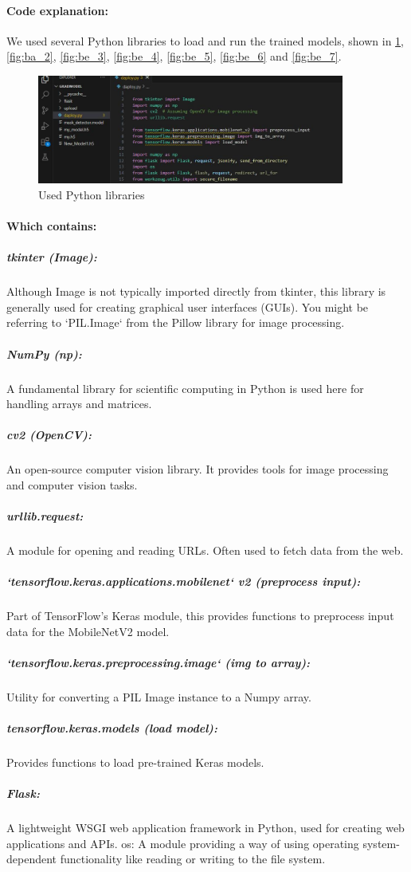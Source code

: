 \paragraph{Code explanation:}

We used several Python libraries to load and run the trained models, shown in \ref{fig:be_1}, \ref{fig:ba_2}, \ref{fig:be_3}, \ref{fig:be_4}, \ref{fig:be_5}, \ref{fig:be_6} and \ref{fig:be_7}.

\begin{figure}
 \centering
    \includegraphics[width=0.90\textwidth]{Img/Chap-01/42.jpg}
    \caption{Used Python libraries}
    \label{fig:be_1}
\end{figure}

\paragraph{Which contains:}
\subparagraph{tkinter (Image):}
 Although Image is not typically imported directly from tkinter, this library is generally used for creating graphical user interfaces (GUIs). You might be referring to `PIL.Image` from the Pillow library for image processing.
 
\subparagraph{NumPy (np):}
 A fundamental library for scientific computing in Python is used here for handling arrays and matrices.
 
\subparagraph{cv2 (OpenCV):}
 An open-source computer vision library. It provides tools for image processing and computer vision tasks.
\subparagraph{urllib.request:}
 A module for opening and reading URLs. Often used to fetch data from the web.
\subparagraph{`tensorflow.keras.applications.mobilenet` v2 (preprocess input):}
 Part of TensorFlow’s Keras module, this provides functions to preprocess input data for the MobileNetV2 model.

\subparagraph{`tensorflow.keras.preprocessing.image` (img to array):}
 Utility for converting a PIL Image instance to a Numpy array.
\subparagraph{tensorflow.keras.models (load model):}
 Provides functions to load pre-trained Keras models.
\subparagraph{Flask:}
 A lightweight WSGI web application framework in Python, used for creating web applications and APIs.
os: A module providing a way of using operating system-dependent functionality like reading or writing to the file system.

